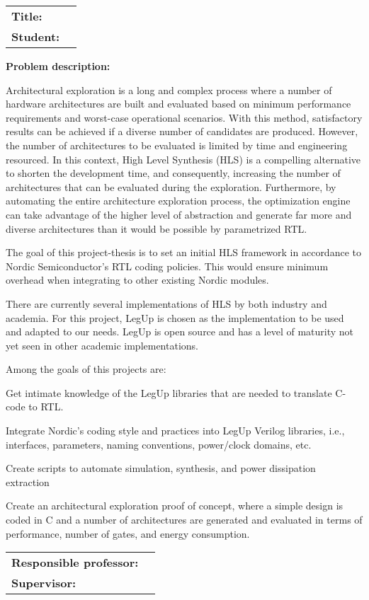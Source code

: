 \begin{titlingpage}

\noindent
\begin{tabular}{@{}p{4cm}p{8cm}}
\textbf{Title:} 	& \thetitle \\
\textbf{Student:}	& \theauthor \\
\end{tabular}

\vspace{2ex}
\noindent\textbf{Problem description:}
\vspace{1ex}

Architectural exploration is a long and complex process where a number of hardware architectures are built and evaluated based on minimum performance requirements and worst-case operational scenarios. With this method, satisfactory results can be achieved if a diverse number of candidates are produced. However, the number of architectures to be evaluated is limited by time and engineering resourced. In this context, High Level Synthesis (HLS) is a compelling alternative to shorten the development time, and consequently, increasing the number of architectures that can be evaluated during the exploration.
Furthermore, by automating the entire architecture exploration process, the optimization engine can take advantage of the higher level of abstraction and generate far more and diverse architectures than it would be possible by parametrized RTL.

The goal of this project-thesis is to set an initial HLS framework in accordance to Nordic Semiconductor's RTL coding policies. This would ensure minimum overhead when integrating to other existing Nordic modules.

There are currently several implementations of HLS by both industry and academia. For this project, LegUp is chosen as the implementation to be used and adapted to our needs. LegUp is open source and has a level of maturity not yet seen in other academic implementations.

Among the goals of this projects are:
\begin{compactitem}
\item Get intimate knowledge of the LegUp libraries that are needed to translate C-code to RTL.
\item Integrate Nordic's coding style and practices into LegUp Verilog libraries, i.e., interfaces, parameters, naming conventions, power/clock domains, etc.
\item Create scripts to automate simulation, synthesis, and power dissipation extraction
\item Create an architectural exploration proof of concept, where a simple design is coded in C and a number of architectures are generated and evaluated in terms of performance, number of gates, and energy consumption.
\end{compactitem}
\vspace{2ex}

\noindent
\begin{tabular}{@{}p{4cm}l}
\textbf{Responsible professor:} 	& \theprofessor \\
\textbf{Supervisor:}			& \thesupervisor \\
\end{tabular}

\end{titlingpage}